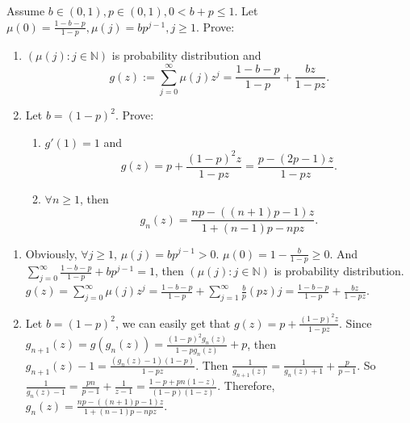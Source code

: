 \documentclass{ctexart}
\begin{document}
\begin{problem}\label{pro:2}
  Assume \(b \in (0,1), p \in (0,1),0 < b + p \leq 1\). Let \(\mu(0)=\frac{1-b-p}{1-p},\mu(j)=bp^{j-1},j \geq 1\).
  Prove:
  \begin{enumerate}
    \item   \((\mu(j):j \in \mathbb{N})\) is probability distribution and \[
        g(z):=\sum_{j=0}^{\infty} \mu(j)z^j=\frac{1-b-p}{1-p} + \frac{bz}{1-pz}.
      \]
    \item Let \(b =(1-p)^2\).
      Prove:
      \begin{enumerate}
        \item   \(g'(1)=1\) and \[
            g(z)=p + \frac{(1-p)^2 z}{1-pz}=\frac{p-(2p-1)z}{1-pz}.
          \]
        \item \(\forall n \geq 1\), then \[
            g_n(z)=\frac{np-((n + 1)p-1)z}{1 + (n-1)p-npz}.
          \]
      \end{enumerate}
  \end{enumerate}
\end{problem}
\begin{solution}
  \begin{enumerate}
    \item Obviously, \(\forall j \geq 1\), \(\mu(j)=bp^{j-1}>0\). \(\mu(0)=1-\frac{b}{1-p}\geq 0\).
      And \(\sum_{j=0}^{\infty} \frac{1-b-p}{1-p}+bp^{j-1}=1\), then \((\mu(j):j \in \mathbb{N})\) is probability distribution.
      \(g(z)=\sum_{j=0}^{\infty} \mu(j)z^j=\frac{1-b-p}{1-p} + \sum_{j=1}^{\infty} \frac{b}{p}(pz)j=\frac{1-b-p}{1-p} + \frac{bz}{1-pz}\).
    \item Let \(b=(1-p)^2\), we can easily get that \(g(z)=p + \frac{(1-p)^2z}{1-pz}\).
      Since \(g_{n + 1}(z)=g(g_n(z))=\frac{(1-p)^2g_n(z)}{1-pg_n(z)} + p\), then \(g_{n + 1}(z)-1=\frac{(g_n(z)-1)(1-p)}{1-pz}\).
      Then \(\frac{1}{g_{n + 1}(z)}=\frac{1}{g_n(z) + 1}+ \frac{p}{p-1}\). So \(\frac{1}{g_n(z)-1}=\frac{pn}{p-1} + \frac{1}{z-1}=\frac{1-p + pn(1-z)}{(1-p)(1-z)}\).
      Therefore, \(g_n(z)=\frac{np-((n + 1)p-1)z}{1 + (n-1)p-npz}\).
  \end{enumerate}
\end{solution}
\end{document}

